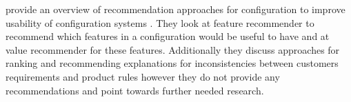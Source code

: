 \begin{description}[style=unboxed, leftmargin=0cm, font=\normalfont]
    \item[\citeauthor{falknerRecommendationTechnologiesConfigurable2011}] provide an overview of recommendation approaches for configuration to improve usability of configuration systems \cite{falknerRecommendationTechnologiesConfigurable2011}. They look at feature recommender to recommend which features in a configuration would be useful to have and at value recommender for these features. Additionally they discuss approaches for ranking and recommending explanations for inconsistencies between customers requirements and product rules however they do not provide any recommendations and point towards further needed research.
\end{description}

